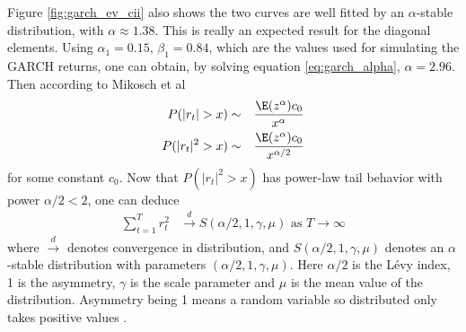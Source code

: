 Figure \ref{fig:garch_ev_cii} also shows the two curves are well fitted
by an $\alpha$-stable distribution, with $\alpha \approx 1.38$. This
is really an expected result for the diagonal elements. Using
$\alpha_1 = 0.15$, $\beta_1 = 0.84$, which are the values used for
simulating the GARCH returns, one can obtain, by solving equation
\ref{eq:garch_alpha}, $\alpha=2.96$. Then according to Mikosch et al
\cite{mikosch2000}
\begin{eqnarray*}
  P(|r_t| > x) &\sim& {\E(z^\alpha) c_0 \over x^\alpha} \\
  P(|r_t|^2 > x) &\sim& {\E(z^\alpha) c_0 \over x^{\alpha/2}} \\
\end{eqnarray*}
for some constant $c_0$. Now that $P(|r_t|^2 > x)$ has power-law tail
behavior with power $\alpha/2 < 2$, one can deduce
\begin{equation}
  \label{eq:stable_CLT}
  \begin{aligned}
    \sum_{t=1}^T r_t^2 &\xrightarrow{d} S(\alpha/2,
    1, \gamma, \mu) \text{ as $T \to \infty$}
  \end{aligned}
\end{equation}
where $\xrightarrow{d}$ denotes convergence in distribution, and
$S(\alpha/2, 1, \gamma, \mu)$ denotes an $\alpha$-stable distribution
with parameters $(\alpha/2, 1, \gamma, \mu)$. Here $\alpha/2$ is the
L\'evy index, 1 is the asymmetry, $\gamma$ is the scale parameter
and $\mu$ is the mean value of the distribution. Asymmetry being 1
means a random variable so distributed only takes positive values
\cite{Bilik2008, Embrechts1997}.

